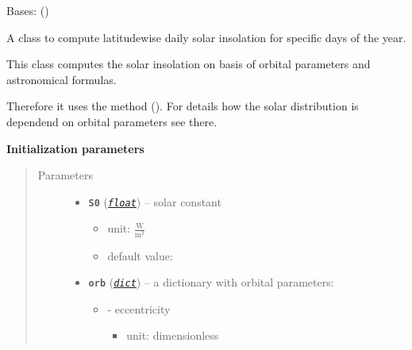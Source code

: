 \documentclass[a4paper,10pt,english]{sphinxmanual}
\begin{document}
\begin{fulllineitems}
\label{api/climlab.radiation:climlab.radiation.insolation.DailyInsolation}
Bases: {\hyperref[api/climlab.radiation:climlab.radiation.insolation.AnnualMeanInsolation]{\emph{}}} ()

A class to compute latitudewise daily solar insolation for specific 
days of the year.

This class computes the solar insolation on basis of orbital parameters and 
astronomical formulas.

Therefore it uses the method {\hyperref[api/climlab.solar:climlab.solar.insolation.daily_insolation]{\emph{}}} ().
For details how the solar distribution is dependend on orbital parameters 
see there.

\textbf{Initialization parameters}
\begin{quote}\begin{description}
\item[{Parameters}] \leavevmode\begin{itemize}
\item {} 
\textbf{\texttt{S0}} (\href{http://docs.python.org/2.7/library/functions.html\#float}{\emph{\texttt{float}}}) -- 
solar constant
\begin{itemize}
\item {} 
unit: \(\frac{\textrm{W}}{\textrm{m}^2}\)

\item {} 
default value: 

\end{itemize}


\item {} 
\textbf{\texttt{orb}} (\href{http://docs.python.org/2.7/library/stdtypes.html\#dict}{\emph{\texttt{dict}}}) -- 
a dictionary with orbital parameters:
\begin{itemize}
\item {} 
 - eccentricity
\begin{itemize}
\item {} 
unit: dimensionless


\end{itemize}
\end{itemize}
\end{itemize}
\end{description}
\end{quote}
\end{fulllineitems}
\end{document}
